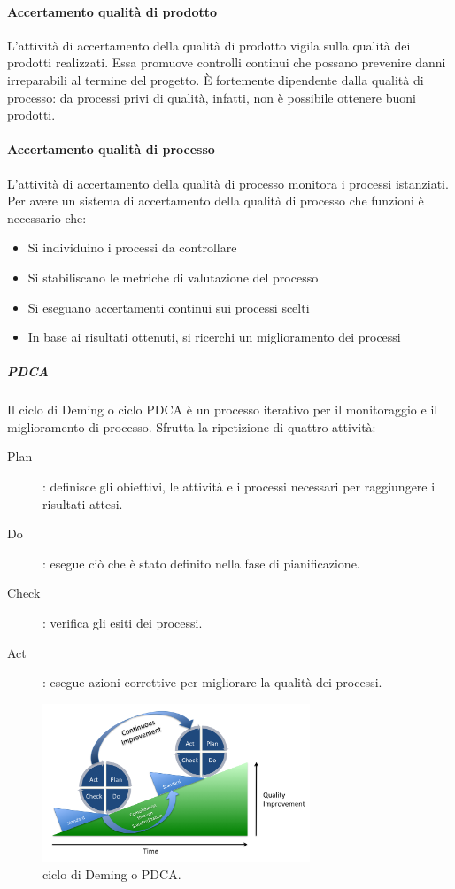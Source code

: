 \documentclass[../norme-di-progetto.tex]{subfiles}
\begin{document}
\paragraph{Accertamento qualità di prodotto}%
\label{par:accertamento_qualita_di_prodotto}
L'attività di accertamento della qualità di prodotto vigila sulla qualità dei prodotti realizzati. Essa promuove controlli continui che possano prevenire danni irreparabili al termine del progetto. È fortemente dipendente dalla qualità di processo: da processi privi di qualità, infatti, non è possibile ottenere buoni prodotti.

\paragraph{Accertamento qualità di processo}%
\label{par:accertamento_qualita_di_processo}
L'attività di accertamento della qualità di processo monitora i processi istanziati. Per avere un sistema di accertamento della qualità di processo che funzioni è necessario che:

\begin{itemize}
  \item Si individuino i processi da controllare
  \item Si stabiliscano le metriche di valutazione del processo
  \item Si eseguano accertamenti continui sui processi scelti
  \item In base ai risultati ottenuti, si ricerchi un miglioramento dei processi
\end{itemize}

\subparagraph{PDCA}%
\label{subp:PDCA}
Il ciclo di Deming o ciclo PDCA è un processo iterativo per il monitoraggio e il miglioramento di processo. Sfrutta la ripetizione di quattro attività:

\begin{description}
  \item [Plan]: definisce gli obiettivi, le attività e i processi necessari per raggiungere i risultati attesi.
  \item [Do]: esegue ciò che è stato definito nella fase di pianificazione.
  \item [Check]: verifica gli esiti dei processi.
  \item [Act]: esegue azioni correttive per migliorare la qualità dei processi.
\end{description}
\begin{figure}[H]
  \includegraphics[width=8cm]{components/img/PDCA-process.png}
  \centering
  \caption{ciclo di Deming o PDCA.}
\end{figure}
\end{document}
